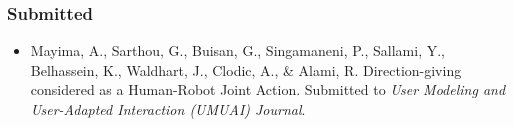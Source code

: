 \subsubsection*{Submitted}

\begin{itemize}
\item Mayima, A., Sarthou, G., Buisan, G., Singamaneni, P., Sallami, Y., Belhassein, K., Waldhart, J., Clodic, A., \& Alami, R. Direction-giving considered as a Human-Robot Joint Action. Submitted to \textit{User Modeling and User-Adapted Interaction (UMUAI) Journal}.
\end{itemize}

